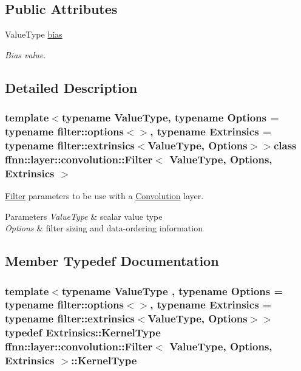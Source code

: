 \subsection*{Public Attributes}
\begin{DoxyCompactItemize}
\item 
Value\-Type \hyperlink{classffnn_1_1layer_1_1convolution_1_1_filter_a3638f1ebfd8d5d4469392dd7b2470cc3}{bias}
\begin{DoxyCompactList}\small\item\em Bias value. \end{DoxyCompactList}\end{DoxyCompactItemize}


\subsection{Detailed Description}
\subsubsection*{template$<$typename Value\-Type, typename Options = typename filter\-::options$<$$>$, typename Extrinsics = typename filter\-::extrinsics$<$\-Value\-Type, Options$>$$>$class ffnn\-::layer\-::convolution\-::\-Filter$<$ Value\-Type, Options, Extrinsics $>$}

\hyperlink{classffnn_1_1layer_1_1convolution_1_1_filter}{Filter} parameters to be use with a \hyperlink{classffnn_1_1layer_1_1_convolution}{Convolution} layer. 


\begin{DoxyParams}{Parameters}
{\em Value\-Type} & scalar value type \\
\hline
{\em Options} & filter sizing and data-\/ordering information \\
\hline
\end{DoxyParams}


\subsection{Member Typedef Documentation}
\hypertarget{classffnn_1_1layer_1_1convolution_1_1_filter_ad5cce121107613f7bfd80ff7df649b96}{
\subsubsection[{Kernel\-Type}]{\setlength{\rightskip}{0pt plus 5cm}template$<$typename Value\-Type , typename Options  = typename filter\-::options$<$$>$, typename Extrinsics  = typename filter\-::extrinsics$<$\-Value\-Type, Options$>$$>$ typedef Extrinsics\-::\-Kernel\-Type {\bf ffnn\-::layer\-::convolution\-::\-Filter}$<$ Value\-Type, Options, Extrinsics $>$\-::{\bf Kernel\-Type}}}\label{classffnn_1_1layer_1_1convolution_1_1_filter_ad5cce121107613f7bfd80ff7df649b96}


